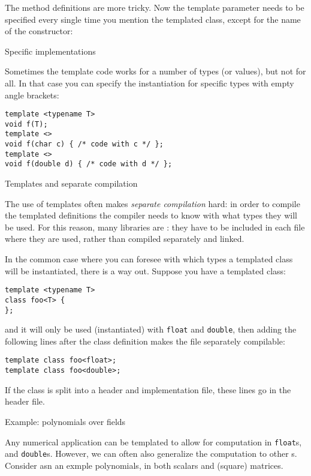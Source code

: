 The method definitions are more tricky.
Now the template parameter needs to be specified every single time
you mention the templated class,
except for the name of the constructor:
%

 {Specific implementations}

Sometimes the template code works for a number of types (or values),
but not for all. In that case you can specify the instantiation for
specific types with empty angle brackets:
\begin{lstlisting}
template <typename T>
void f(T);
template <> 
void f(char c) { /* code with c */ };
template <>
void f(double d) { /* code with d */ };
\end{lstlisting}

 {Templates and separate compilation}
\label{sec:templ-header}

The use of templates often makes
\emph{separate compilation}
hard: in order to compile the
templated definitions the compiler needs to know with what types they
will be used.
For this reason, many libraries are :
they have to be included in each file where they are used,
rather than compiled separately and linked.

In the common case where you can foresee with which types
a templated class will be instantiated, there is a way out.
Suppose you have a templated class:
\begin{lstlisting}
template <typename T>
class foo<T> {
};
\end{lstlisting}
and it will only be used (instantiated) with \lstinline{float} and
\lstinline{double}, then adding the following lines after the class definition
makes the file separately compilable:
\begin{lstlisting}
template class foo<float>;
template class foo<double>;
\end{lstlisting}

If the class is split into a header and implementation file,
these lines go in the header file.

 {Example: polynomials over fields}
\label{sec:poly-template}

Any numerical application can be templated to
allow for computation in
 \lstinline{float}s,
and
 \lstinline{double}s.
However, we can often also generalize the computation
to other s.
Consider asn an exmple polynomials,
in both scalars and (square) matrices.

